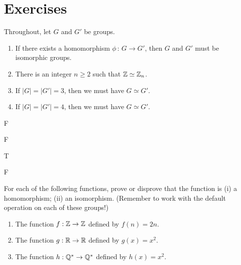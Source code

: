\pagebreak
\section{Exercises}


\begin{exercise}[ID=3A]
\tf Throughout, let $G$ and $G'$ be  groups.

\begin{enumerate}
\item If there exists a homomorphism $\phi\,:\,G\to G'$, then $G$ and $G'$ must be isomorphic groups.

\item There is an integer $n\geq 2$ such that $\mathbb{Z}\simeq \mathbb{Z}_n$.

\item If $|G|=|G'|=3$, then we must have $G\simeq G'$.

\item If $|G|=|G'|=4$, then we must have $G\simeq G'$.
\end{enumerate}
\end{exercise}


\begin{solution}[print=false]
\begin{inparaenum}[(a)]
\item F \hfill \item F \hfill \item  T \hfill \item F
\end{inparaenum}
\end{solution}

\begin{exercise}For each of the following functions, prove or
    disprove that the function is (i) a homomorphism; (ii)
    an isomorphism. (Remember to work with the default operation on each of these groups!)
\begin{enumerate}
\item The function $f:\mathbb{Z}\to\mathbb{Z}$ defined by $f(n)=2n$.
\item The function $g:\mathbb{R}\to\mathbb{R}$ defined by $g(x)=x^2$.
\item The function $h:\mathbb{Q}^*\to\mathbb{Q}^*$ defined by
    $h(x)=x^2$.
\end{enumerate}

\end{exercise}

